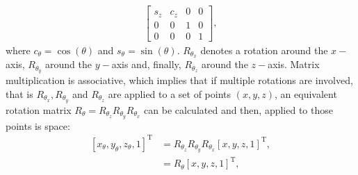 \begin{refsection}
\begin{align}
\begin{bmatrix}
                    s_z & c_z & 0 &0\\
                    0 & 0 & 1 &0\\
                    0 & 0 & 0 &1
    \end{bmatrix},
\end{align}
where $c_\theta=\cos(\theta)$ and $s_\theta=\sin(\theta)$. $R_{\theta_x}$ denotes a rotation around the $x-$axis, $R_{\theta_y}$ around the $y-$axis and, finally, $R_{\theta_z}$ around the $z-$axis. Matrix multiplication is associative, which implies that if multiple rotations are involved, that is $R_{\theta_x}, R_{\theta_y}$ and $R_{\theta_z}$ are applied to a set of points $(x,y,z)$, an equivalent rotation matrix $R_{\theta}=R_{\theta_z}R_{\theta_y}R_{\theta_x}$ can be calculated and then, applied to those points is space: 
\begin{align}\label{eq:affine2}
    [x_\theta,y_\theta,z_\theta,1]^\text{T} & = R_{\theta_z}R_{\theta_y}R_{\theta_x}[x,y,z,1]^\text{T},\nonumber \\
     & = R_\theta[x,y,z,1]^\text{T},
\end{align}{}

\end{refsection}
